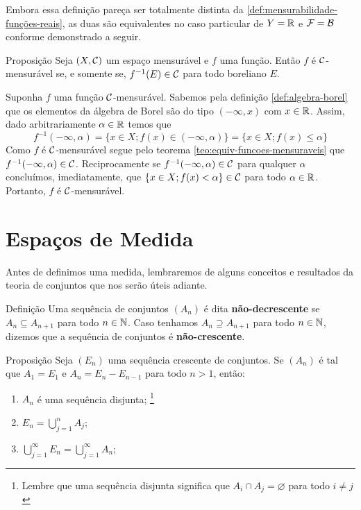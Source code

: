 Embora essa definição pareça ser totalmente distinta da \ref{def:mensurabilidade-funções-reais}, as duas são equivalentes no caso particular de $Y = \mathbb{R}$ e $\mathcal{F} = \operatorname{\mathcal{B}}$ conforme demonstrado a seguir.

\begin{env}{Proposição}
	Seja $(X, \operatorname{\mathcal{C}})$ um espaço mensurável e $f$ uma função.
	Então $f$ é $\operatorname{\mathcal{C}}$-mensurável se, e somente se, $f^{-1}(E) \in \operatorname{\mathcal{C}}$ para todo boreliano $E$. 
\end{env}
\begin{prova}
	Suponha $f$ uma função $\operatorname{\mathcal{C}}$-mensurável. 
	Sabemos pela definição \ref{def:algebra-borel} que os elementos da álgebra de Borel são do tipo $(-\infty,x)$ com $x \in \mathbb{R}$.
	Assim, dado arbitrariamente $\alpha \in \mathbb{R}$ temos que
	$$
	f^{-1}(-\infty, \alpha)
	=\{x \in X; f(x) \in (-\infty, \alpha)\}
	=\{x \in X; f(x) \leq \alpha\}
	$$
	Como $f$ é $\operatorname{\mathcal{C}}$-mensurável segue pelo teorema \ref{teo:equiv-funcoes-mensuraveis} que $f^{-1}(-\infty, \alpha) \in \operatorname{\mathcal{C}}$.
	Reciprocamente se 
	$f^{-1}(-\infty, \alpha) \in \operatorname{\mathcal{C}}$ para qualquer $\alpha$ concluímos, imediatamente, que $\{x \in X; f(x) < \alpha\} \in \operatorname{\mathcal{C}}$ para todo $\alpha \in \mathbb{R}$.
	Portanto, $f$ é $\operatorname{\mathcal{C}}$-mensurável.
\end{prova}

\section{Espaços de Medida}
Antes de definimos uma medida, lembraremos de alguns conceitos e resultados da teoria de conjuntos que nos serão úteis adiante.

\begin{env}{Definição}
\label{def:sequência-crescente-decrescente-de-conjuntos}
    Uma sequência de conjuntos $(A_n)$ é dita \textbf{não-decrescente} se $A_n \subseteq A_{n+1}$ para todo $n \in \operatorname{\mathbb{N}}$.
    Caso tenhamos $A_n \supseteq A_{n+1}$ para todo $n \in \operatorname{\mathbb{N}}$, dizemos que a sequência  de conjuntos é \textbf{não-crescente}.
\end{env}

\begin{env}{Proposição}
\label{prop:sequencia-crescente-conjuntos-resultado-A_n}
Seja $(E_n)$ uma sequência crescente de conjuntos. Se $(A_n)$ é tal que $A_1 = E_1$ e $A_n = E_n - E_{n -1}$ para todo $n > 1$, então:
\begin{enumerate}[label* = (\roman*)]
    \item $A_n$ é uma sequência disjunta;
        \footnote{Lembre que uma sequência disjunta significa que $A_i \cap A_j = \varnothing$ para todo $i \neq j$}
    \item $E_n = \displaystyle \bigcup_{j = 1}^n A_j$;
    \item $\displaystyle \bigcup_{j = 1}^\infty E_n = \displaystyle \bigcup_{j = 1}^\infty A_n$;
\end{enumerate}
\end{env}


